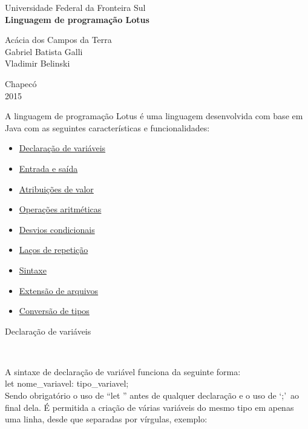 \documentclass[12pt,a4paper]{article}
\begin{document}
\begin{titlepage}
\begin{center}
{\large Universidade Federal da Fronteira Sul}\\[5.5cm]
{\bf \huge Linguagem de programação Lotus}\\[4.9cm]
\end{center}
{\large Acácia dos Campos da Terra}\\
{\large Gabriel Batista Galli}\\
{\large Vladimir Belinski}\\[5.8cm]
\begin{center}
{\large Chapecó}\\[0.1cm]
{\large 2015}
\end{center}
\end{titlepage}

A linguagem de programação Lotus é uma linguagem desenvolvida com base em Java com as seguintes características e funcionalidades:\\

\begin{itemize}
\item \hyperlink{label}{Declaração de variáveis}
\item \hyperlink{label1}{Entrada e saída}
\item \hyperlink{label2}{Atribuições de valor}
\item \hyperlink{label3}{Operações aritméticas}
\item \hyperlink{label4}{Desvios condicionais}
\item \hyperlink{label5}{Laços de repetição}
\item \hyperlink{label6}{Sintaxe}
\item \hyperlink{label7}{Extensão de arquivos}
\item \hyperlink{label8}{Conversão de tipos}\\[15.4cm]
\end{itemize}

\hypertarget{label}{\Large{Declaração de variáveis}}\\[0.3cm]
\normalsize

A sintaxe de declaração de variável funciona da seguinte forma:\\

let nome\_variavel: tipo\_variavel;\\

Sendo obrigatório o uso de ``let '' antes de qualquer declaração e o uso de `;'\ ao final dela. É permitida a criação de várias variáveis do mesmo tipo em apenas uma linha, desde que separadas por vírgulas, exemplo:\\
\end{document}
